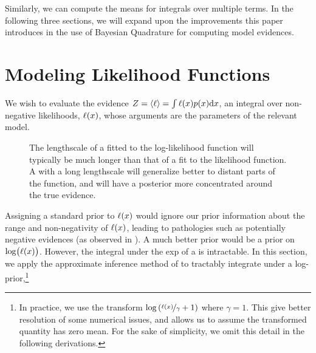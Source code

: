 \documentclass{article}
\begin{document}
%
Similarly, we can compute the means for integrals over multiple terms. In the following three sections, we will expand upon the improvements this paper introduces in the use of Bayesian Quadrature for computing model evidences.

\section{Modeling Likelihood Functions}\label{sec:model_lik}

We wish to evaluate the evidence $Z = \inty{\lfn} = \int \lfn(\lfv) p(\lfv) \ud\lfv$, an integral over non-negative likelihoods, $\lfn(\lfv)$, whose arguments are the parameters of the relevant model.


 \begin{figure}
 \centering
 \caption{The lengthscale of a \gpb fitted to the log-likelihood function will typically be much longer than that of a \gpb fit to the likelihood function.  A \gpb with a long lengthscale will generalize better to distant parts of the function, and will have a posterior more concentrated around the true evidence. }
 \label{fig:log_is_better}
 \end{figure}

Assigning a standard \gpb prior to $\lfn(\lfv)$ would ignore our prior information about the range and non-negativity of $\lfn(\lfv)$, leading to pathologies such as potentially negative evidences (as observed in \citet{BZMonteCarlo}).  A much better prior would be a \gpb prior on $\log\bigl(\lfn(x)\bigr)$.  However, the integral under the exp of a \gpb is intractable.  In this section, we apply the approximate inference method of \citep{BQR} to tractably integrate under a log-\gpb prior,\footnote{In practice, we use the transform 
$\log\left(\nicefrac{\lfn(\lfv)}{\gamma} + 1\right)$
where $\gamma = 1$.  This give better resolution of some numerical issues, and allows us to assume the transformed quantity has zero mean. For the sake of simplicity, we omit this detail in the following derivations.}
\end{document}

